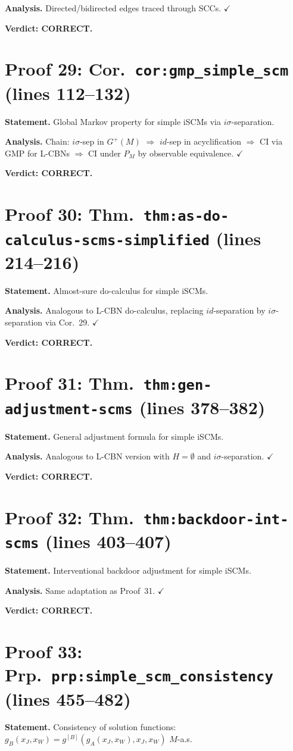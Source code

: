 \documentclass{article}
\begin{document}
\textbf{Analysis.} Directed/bidirected edges traced through SCCs.  $\checkmark$

\textbf{Verdict: CORRECT.}

\section{Proof 29: Cor.\ \texttt{cor:gmp\_simple\_scm} (lines 112--132)}
\textbf{Statement.} Global Markov property for simple iSCMs via
$i\sigma$-separation.

\textbf{Analysis.} Chain: $i\sigma$-sep in $G^+(M)$ $\Rightarrow$ $id$-sep in
acyclification $\Rightarrow$ CI via GMP for L-CBNs $\Rightarrow$ CI under
$P_M$ by observable equivalence.  $\checkmark$

\textbf{Verdict: CORRECT.}

\section{Proof 30: Thm.\ \texttt{thm:as-do-calculus-scms-simplified}
(lines 214--216)}
\textbf{Statement.} Almost-sure do-calculus for simple iSCMs.

\textbf{Analysis.} Analogous to L-CBN do-calculus, replacing $id$-separation
by $i\sigma$-separation via Cor.~29.  $\checkmark$

\textbf{Verdict: CORRECT.}

\section{Proof 31: Thm.\ \texttt{thm:gen-adjustment-scms} (lines 378--382)}
\textbf{Statement.} General adjustment formula for simple iSCMs.

\textbf{Analysis.} Analogous to L-CBN version with $H=\emptyset$ and
$i\sigma$-separation.  $\checkmark$

\textbf{Verdict: CORRECT.}

\section{Proof 32: Thm.\ \texttt{thm:backdoor-int-scms} (lines 403--407)}
\textbf{Statement.} Interventional backdoor adjustment for simple iSCMs.

\textbf{Analysis.} Same adaptation as Proof~31.  $\checkmark$

\textbf{Verdict: CORRECT.}

\section{Proof 33: Prp.\ \texttt{prp:simple\_scm\_consistency} (lines 455--482)}
\textbf{Statement.} Consistency of solution functions:
$g_B(x_J,x_W)=g^{[B]}(g_A(x_J,x_W),x_J,x_W)$ $M$-a.s.
\end{document}
